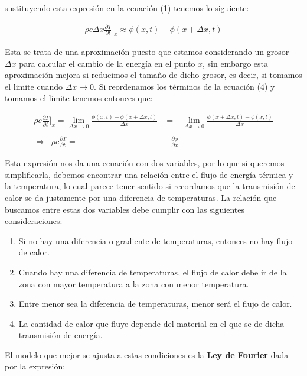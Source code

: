 \documentclass[12pt]{article}
\begin{document}
sustituyendo esta expresión en la ecuación (1) tenemos lo siguiente:

\begin{align}
    \rho c\Delta x\frac{\partial T}{\partial t}\Big|_x  \approx \phi(x,t) - \phi(x+\Delta x,t)
\end{align}

Esta se trata de una aproximación puesto que estamos considerando un grosor $\Delta x$ para calcular el cambio de la energía en el punto $x$, sin embargo esta aproximación mejora si reducimos el tamaño de dicho grosor, es decir, si tomamos el limite cuando $\Delta x \rightarrow 0$. Si reordenamos los términos de la ecuación (4) y tomamos el limite tenemos entonces que:

\begin{align}
    \nonumber \rho c\frac{\partial T}{\partial t}\Big|_x  = \lim_{\Delta x \to 0} \frac{\phi(x,t) - \phi(x+\Delta x,t)}{\Delta x}& = -\lim_{\Delta x \to 0} \frac{\phi(x+\Delta x,t)-\phi(x,t)}{\Delta x} \\
    \nonumber \\
    \Rightarrow \;\;\rho c\frac{\partial T}{\partial t} = &-\frac{\partial \phi}{\partial x}
\end{align}

Esta expresión nos da una ecuación con dos variables, por lo que si queremos simplificarla, debemos encontrar una relación entre el flujo de energía térmica y la temperatura, lo cual parece tener sentido si recordamos que la transmisión de calor se da justamente por una diferencia de temperaturas. La relación que buscamos entre estas dos variables debe cumplir con las siguientes consideraciones: \\

\begin{enumerate}
    \item Si no hay una diferencia o gradiente de temperaturas, entonces no hay flujo de calor.
    \item Cuando hay una diferencia de temperaturas, el flujo de calor debe ir de la zona con mayor temperatura a la zona con menor temperatura.
    \item Entre menor sea la diferencia de temperaturas, menor será el flujo de calor.
    \item La cantidad de calor que fluye depende del material en el que se de dicha transmisión de energía.
\end{enumerate}

El modelo que mejor se ajusta a estas condiciones es la \textbf{Ley de Fourier} dada por la expresión:
\end{document}
